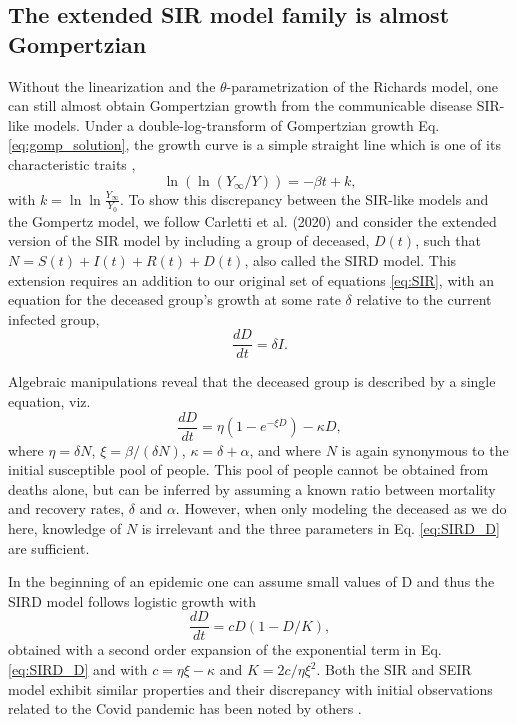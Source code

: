 \documentclass{article}
\begin{document}
\subsection*{The extended SIR model family is almost Gompertzian}
Without the linearization and the $\theta$-parametrization of the Richards model, one can still almost obtain Gompertzian growth from the communicable disease SIR-like models. Under a double-log-transform of Gompertzian growth Eq. \ref{eq:gomp_solution}, the growth curve is a simple straight line which is one of its characteristic traits \cite{Levitt2020},
\begin{equation}
\label{eq:GOMP_D}
\ln{(\ln{(Y_{\infty}/Y)})} = -\beta t + k,
\end{equation}
with $k=\ln{\ln{\frac{Y_{\infty}}{Y_{0}}}}$. To show this discrepancy between the SIR-like models and the Gompertz model, we follow Carletti et al. (2020) \cite{carletti2020covid} and consider the extended version of the SIR model by including a group of deceased, $D(t)$, such that $N = S(t) + I(t) + R(t) + D(t)$, also called the SIRD model. This extension requires an addition to our original set of equations \ref{eq:SIR}, with an equation for the deceased group's growth at some rate $\delta$ relative to the current infected group,
\begin{equation}
\frac{dD}{dt} = \delta I.
\end{equation}

Algebraic manipulations reveal that the deceased group is described by a single equation, viz.
\begin{equation}
\label{eq:SIRD_D}
\frac{dD}{dt} = \eta( 1 - e^{-\xi D}) - \kappa D,
\end{equation}
where $\eta = \delta N$, $\xi = \beta/(\delta N)$, $\kappa = \delta + \alpha$, and where $N$ is again synonymous to the initial susceptible pool of people. This pool of people cannot be obtained from deaths alone, but can be inferred by assuming a known ratio between mortality and recovery rates, $\delta$ and $\alpha$. 
However, when only modeling the deceased as we do here, knowledge of $N$ is irrelevant and the three parameters in Eq. \ref{eq:SIRD_D} are sufficient.

In the beginning of an epidemic one can assume small values of D and thus the SIRD model follows logistic growth with
\begin{equation}
\frac{dD}{dt} = c D (1 - D/K),
\end{equation}
obtained with a second order expansion of the exponential term in Eq. \ref{eq:SIRD_D} and with $c=\eta\xi - \kappa$ and $K=2c/\eta\xi^2$. Both the SIR and SEIR model exhibit similar properties and their discrepancy with initial observations related to the Covid pandemic has been noted by others \cite{vattay2020forecasting}.
\end{document}
